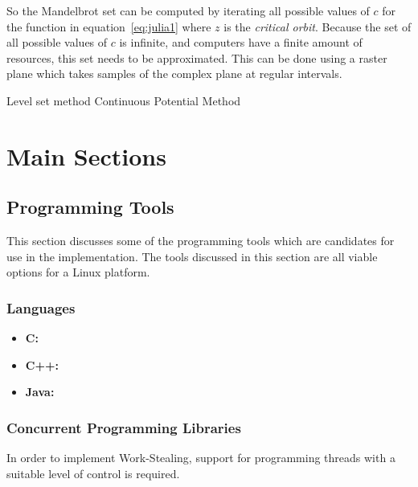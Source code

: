 So the Mandelbrot set can be computed by iterating all possible values of \(c\) for the function in equation~\ref{eq:julia1} where \(z\) is the \textit{critical
orbit}. Because the set of all possible values of \(c\) is infinite, and computers have a finite amount of resources, this set needs to be approximated. 
This can be done using a raster plane which takes samples of the complex plane at regular intervals. 

Level set method \cite[p.~188]{fractimg} Continuous Potential Method \cite[p.~191]{fractimg}

\chapter{Main Sections}
\section{Programming Tools}

This section discusses some of the programming tools which are candidates
for use in the implementation.
The tools discussed in this section are all viable options for a Linux platform.

\subsection*{Languages}

\begin{itemize}
\item \textbf{C:} 
\item \textbf{C++:}
\item \textbf{Java:}
\end{itemize}

\subsection*{Concurrent Programming Libraries}
In order to implement Work-Stealing, support for programming threads 
with a suitable level of control is required.

